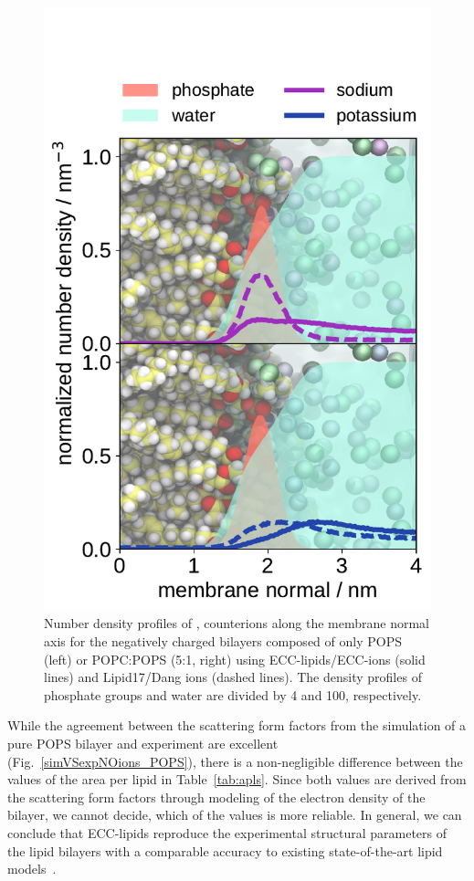 \documentclass[journal=jpcbfk,manuscript=article]{achemso}
\newlength{\figheight}
\begin{document}
\begin{figure}[tbp!]
  \includegraphics[height=\figheight]{../img/ecc_pops/density_profiles_na-k-counterions_wat_phos_compar_5PC-1PS_ecclipids-lipid17.pdf}
  \caption{\label{fig:POPS-counterions-dens}
    Number density profiles of ,  counterions along the membrane normal axis 
    for the negatively charged bilayers composed of only POPS (left) or POPC:POPS (5:1, right) 
    using ECC-lipids/ECC-ions (solid lines) and Lipid17/Dang ions (dashed lines).  
    The density profiles of phosphate groups and water are divided by 4 and 100, respectively.  
}
\end{figure} 


While the agreement between the scattering form factors 
from the simulation of a pure POPS bilayer and experiment 
are excellent (Fig.~\ref{simVSexpNOions_POPS}),
there is a non-negligible difference between the values of the area per lipid in Table~\ref{tab:apls}. 
Since both values are derived from the scattering form factors through modeling of the electron density of the bilayer,
we cannot decide, which of the values is more reliable. 
In general, we can conclude that ECC-lipids
reproduce the experimental structural parameters of the lipid bilayers 
with a comparable accuracy to existing state-of-the-art lipid models~\citep{botan15, ollila16, Pluhackova2016}. 
\end{document}

